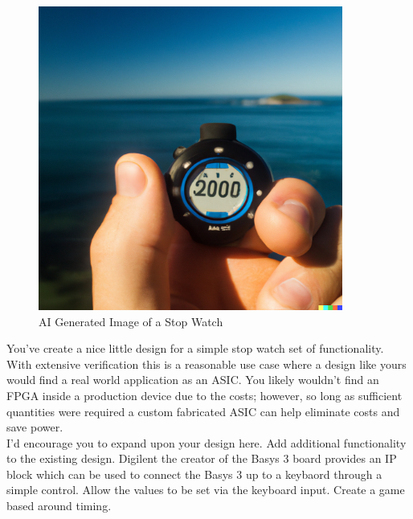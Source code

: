 \begin{figure}[H]
    \centering
    \includegraphics[width = 10cm]{Images/StopWatch.png}
    \caption{AI Generated Image of a Stop Watch}
    \label{fig:enter-label}
\end{figure}
You've create a nice little design for a simple stop watch set of functionality. With extensive verification this is a reasonable use case where a design like yours would find a real world application as an ASIC. You likely wouldn't find an FPGA inside a production device due to the costs; however, so long as sufficient quantities were required a custom fabricated ASIC can help eliminate costs and save power. \\
\vspace{0.5cm}
I'd encourage you to expand upon your design here. Add additional functionality to the existing design. Digilent the creator of the Basys 3 board provides an IP block which can be used to connect the Basys 3 up to a keybaord through a simple control. Allow the values to be set via the keyboard input. Create a game based around timing. 